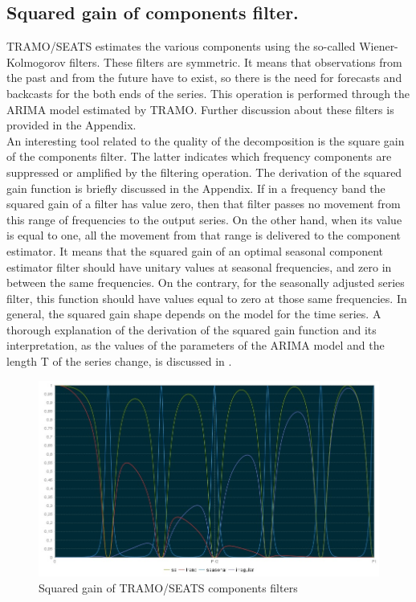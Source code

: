 \documentclass[english,blauw]{cbsdiscussionpaper}
\begin{document}
\subsection{Squared gain of components filter.}
TRAMO/SEATS estimates the various components using the so-called Wiener-Kolmogorov filters. These filters are symmetric. It means that observations from the past and from the future have to exist, so there is the need for forecasts and backcasts for the both ends of the series. This operation is performed through the ARIMA model estimated by TRAMO. Further discussion about these filters is provided in the Appendix.\\An interesting tool related to the quality of the decomposition is the square gain of the components filter. The latter indicates which frequency components are suppressed or amplified by the filtering operation. The derivation of the squared gain function is briefly discussed in the Appendix. If in a frequency band the squared gain of a filter has value zero, then that filter passes no movement from this range of frequencies to the output series. On the other hand, when its value is equal to one, all the movement from that range is delivered to the component estimator. It means that the squared gain of an optimal seasonal component estimator filter should have unitary values at seasonal frequencies, and zero in between the same frequencies. On the contrary, for the seasonally adjusted series filter, this function should have values equal to zero at those same frequencies. In general, the squared gain shape depends on the model for the time series. A thorough explanation of the derivation of the squared gain function and its interpretation, as the values of the parameters of the ARIMA model and the length T of the series change, is discussed in \citep{fineal2006}.
\begin{figure}[h]
\includegraphics[width=\linewidth]{../images/capitolo3/squaredgain.jpg}
\caption{Squared gain of TRAMO/SEATS components filters}
\label{fig:squaredgain}
\end{figure}
\end{document}

